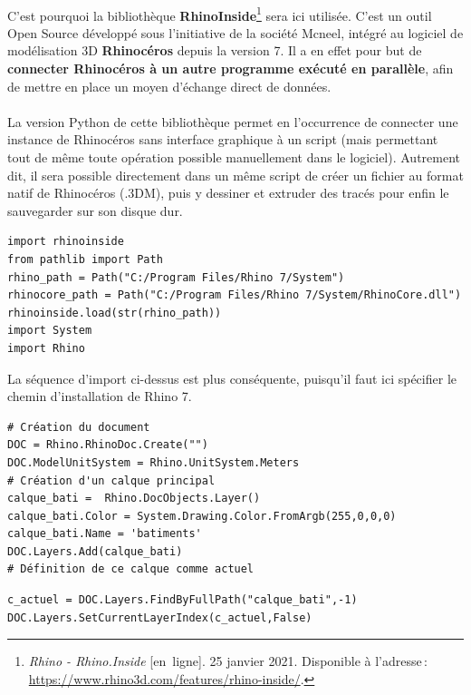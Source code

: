 \documentclass[
  11pt,
  french,
]{article}
\begin{document}
~\\
C'est pourquoi la bibliothèque \textbf{RhinoInside}\footnote{\emph{Rhino
  - Rhino.Inside} {[}en~ligne{]}. 25 janvier 2021. Disponible à
  l'adresse\,: \url{https://www.rhino3d.com/features/rhino-inside/}.}
sera ici utilisée. C'est un outil Open Source développé sous
l'initiative de la société Mcneel, intégré au logiciel de modélisation
3D \textbf{Rhinocéros} depuis la version 7. Il a en effet pour but de
\textbf{connecter Rhinocéros à un autre programme exécuté en parallèle},
afin de mettre en place un moyen d'échange direct de données.\\
~\\
La version Python de cette bibliothèque permet en l'occurrence de
connecter une instance de Rhinocéros sans interface graphique à un
script (mais permettant tout de même toute opération possible
manuellement dans le logiciel). Autrement dit, il sera possible
directement dans un même script de créer un fichier au format natif de
Rhinocéros (.3DM), puis y dessiner et extruder des tracés pour enfin le
sauvegarder sur son disque dur.\\

\begin{tcolorbox}[title= Chargement d'une instance de RhinoInside ,colback=boitecode]
\begin{lstlisting}[style=code]
import rhinoinside
from pathlib import Path
rhino_path = Path("C:/Program Files/Rhino 7/System")
rhinocore_path = Path("C:/Program Files/Rhino 7/System/RhinoCore.dll")
rhinoinside.load(str(rhino_path))
import System
import Rhino\end{lstlisting}
\end{tcolorbox}

La séquence d'import ci-dessus est plus conséquente, puisqu'il faut ici
spécifier le chemin d'installation de Rhino 7.

\begin{tcolorbox}[title= Initialisation du nouveau fichier Rhino et d'un calque principal ,colback=boitecode]
\begin{lstlisting}[style=code]
# Création du document
DOC = Rhino.RhinoDoc.Create("")
DOC.ModelUnitSystem = Rhino.UnitSystem.Meters
# Création d'un calque principal
calque_bati =  Rhino.DocObjects.Layer()
calque_bati.Color = System.Drawing.Color.FromArgb(255,0,0,0)
calque_bati.Name = 'batiments'
DOC.Layers.Add(calque_bati)
# Définition de ce calque comme actuel\end{lstlisting}
\begin{lstlisting}[style=code]
c_actuel = DOC.Layers.FindByFullPath("calque_bati",-1)
DOC.Layers.SetCurrentLayerIndex(c_actuel,False)\end{lstlisting}
\end{tcolorbox}
\end{document}

